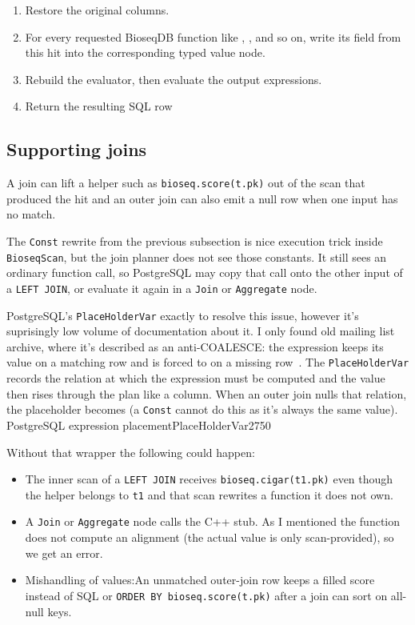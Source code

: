 \begin{algorithm}[htbp]
\caption{How to return tuple}
\label{alg:scan-project-hit}
\small
\begin{enumerate}
  \item Restore the original columns.
  \item For every requested BioseqDB function like , ,  and so on, write its field from this hit into the
    corresponding typed value node.
  \item Rebuild the evaluator, then evaluate the output expressions.
  \item Return the resulting SQL row
\end{enumerate}
\end{algorithm}

\subsection{Supporting joins}

A join can lift a helper such as \texttt{bioseq.score(t.pk)} out of the scan that produced the hit and an outer join can also emit a null row when one input has no match.

The \texttt{Const} rewrite from the previous subsection is nice execution trick inside \texttt{BioseqScan}, but the join planner does not see those constants.
It still sees an ordinary function call, so PostgreSQL may copy that call onto the other input of a \texttt{LEFT JOIN}, or evaluate it again in a \texttt{Join} or \texttt{Aggregate} node.

PostgreSQL's \texttt{PlaceHolderVar} exactly to resolve this issue, however it's suprisingly low volume of documentation about it. I only found old mailing list archive, where it's described as an anti-COALESCE: the expression keeps its value on a matching row and is forced to  on a missing row~\autocite{lane2010_placeholdervar}.
The \texttt{PlaceHolderVar} records the relation at which the expression must be computed and the value then rises through the plan like a column.
When an outer join nulls that relation, the placeholder becomes  (a \texttt{Const} cannot do this as it's always the same value).
  {PostgreSQL expression placement}{PlaceHolderVar}{2750}

Without that wrapper the following could happen:
\begin{itemize}
  \item The inner scan of a \texttt{LEFT JOIN} receives \texttt{bioseq.cigar(t1.pk)} even though the helper belongs to \texttt{t1} and that scan rewrites a function it does not own.
  \item A \texttt{Join} or \texttt{Aggregate} node calls the C++ stub. As I mentioned the function does not compute an alignment (the actual value is only scan-provided), so we get an error.
  \item Mishandling of  values:An unmatched outer-join row keeps a filled score instead of SQL  or \texttt{ORDER BY bioseq.score(t.pk)} after a join can sort on all-null keys.
\end{itemize}

